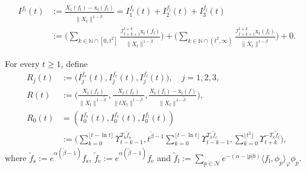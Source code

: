 \documentclass[12pt,a4paper]{amsart}
\theoremstyle{plain}
\theoremstyle{definition}
\numberwithin{equation}{section}
\begin{document}
\begin{align}
  \\ I^{f_\mathrm l}(t) &:= \frac{X_t(f_\mathrm l) - \mathrm x_t(f_\mathrm l)}{\|X_t\|^{1- \tilde \beta}}
  = I^{f_\mathrm l}_1(t) + I^{f_\mathrm l}_2(t) + I^{f_\mathrm l}_3(t)
  \\& := \Big(\sum_{k\in \mathbb N \cap [0,t^2]} \frac{ \mathcal I_{t+k+1}^{t+k}\mathrm x_t(f_\mathrm l)}{\|X_t\|^{1- \tilde \beta}}\Big) + \Big(\sum_{k\in \mathbb N \cap (t^2,\infty)}  \frac{ \mathcal I_{t+k+1}^{t+k}\mathrm x_t(f_\mathrm l)}{\|X_t\|^{1- \tilde \beta}}\Big)+0.
  \end{align}

	For every $t\geq 1$, define 
\begin{align}
	R_j(t)&:=\big(I_j^{f_\mathrm s}(t),I_j^{f_\mathrm c}(t),I_j^{f_\mathrm l}(t)\big), \quad j = 1,2,3,
	\\ R(t)&:=\Bigg( \frac{X_t(f_\mathrm s)}{\|X_t\|^{1-\tilde \beta}},\frac{X_t(f_\mathrm c)}{\|tX_t\|^{1-\tilde \beta}},\frac{ X_t(f_\mathrm l) - \mathrm x_t(f)}{\|X_t\|^{1-\tilde \beta}}\Bigg),
    \\R_0(t)&=(I_0^{f_\mathrm s}(t),I_0^{f_\mathrm c}(t),I_0^{f_\mathrm l}(t))
    \\&:=\Big(\sum_{k=0}^{\lfloor t-\ln t \rfloor} \Upsilon_{t-k-1}^{T_k \tilde f_\mathrm s},t^{\tilde \beta - 1}\sum_{k=0}^{\lfloor t-\ln t \rfloor} \Upsilon_{t-k-1}^{T_{k} \tilde f_\mathrm c},\sum_{k = 0}^{\lfloor t^2 \rfloor} \Upsilon_{t+k}^{- T_k \tilde f_\mathrm l}\Big),
\end{align}
where $\tilde f_\mathrm s:=e^{\alpha(\tilde \beta - 1)} f_\mathrm s$, $\tilde f_\mathrm c:=e^{\alpha(\tilde \beta - 1)} f_\mathrm c$ and  $\tilde f_\mathrm l := \sum_{p\in \mathcal N} e^{-(\alpha - |p|b)}\langle f_\mathrm l, \phi_p \rangle_\varphi \phi_p$.
\end{document}
